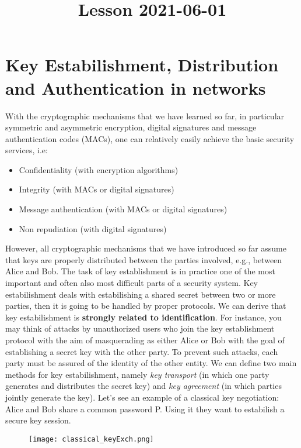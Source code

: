 \documentclass{article}
\title{Lesson 2021-06-01}
\begin{document}
\date{}
\maketitle
\section{Key Estabilishment, Distribution and Authentication in networks}
With the cryptographic mechanisms that we have learned so far, in particular symmetric and asymmetric encryption, digital signatures and message authentication
codes (MACs), one can relatively easily achieve the basic security services, i.e:
\begin{itemize}
    \item Confidentiality (with encryption algorithms)
    \item Integrity (with MACs or digital signatures)
    \item Message authentication (with MACs or digital signatures)
    \item Non repudiation (with digital signatures)
\end{itemize}
However, all cryptographic mechanisms that we have introduced so far assume
that keys are properly distributed between the parties involved, e.g., between Alice
and Bob. The task of key establishment is in practice one of the most important and
often also most difficult parts of a security system.\newline
Key estabilishment deals with estabilishing a shared secret between two or more parties, then it is going to be handled by proper protocols. We can derive that key estabilishment is \textbf{strongly related to identification}. For instance, you
may think of attacks by unauthorized users who join the key establishment protocol
with the aim of masquerading as either Alice or Bob with the goal of establishing a
secret key with the other party. To prevent such attacks, each party must be assured
of the identity of the other entity.\newline
We can define two main methods for key estabilishment, namely \textit{key transport} (in which one party generates and distributes the secret key) and \textit{key agreement} (in which parties jointly generate the key).
\newline Let's see an example of a classical key negotiation:
\newline Alice and Bob share a common password P. Using it they want to estabilish a secure key session.
\begin{figure} [H]
    \centering
    \texttt{[image: classical\_keyExch.png]}
\end{figure}
\end{document}
